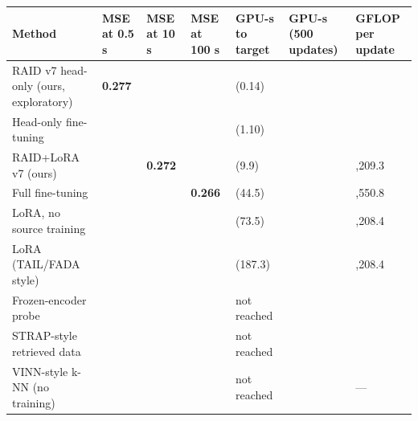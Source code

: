 \documentclass[11pt,a4paper]{article}
\begin{document}
{\def\LTcaptype{none} %
{\small
\begin{longtable}[]{@{}
  >{\raggedright\arraybackslash}p{}
  >{\raggedright\arraybackslash}p{}
  >{\raggedright\arraybackslash}p{}
  >{\raggedright\arraybackslash}p{}
  >{\raggedright\arraybackslash}p{}
  >{\raggedright\arraybackslash}p{}
  >{\raggedright\arraybackslash}p{}@{}}
\toprule\noalign{}
\begin{minipage}[b]{\linewidth}\raggedright
Method
\end{minipage} & \begin{minipage}[b]{\linewidth}\raggedright
MSE at 0.5 s
\end{minipage} & \begin{minipage}[b]{\linewidth}\raggedright
MSE at 10 s
\end{minipage} & \begin{minipage}[b]{\linewidth}\raggedright
MSE at 100 s
\end{minipage} & \begin{minipage}[b]{\linewidth}\raggedright
GPU-s to target
\end{minipage} & \begin{minipage}[b]{\linewidth}\raggedright
GPU-s (500 updates)
\end{minipage} & \begin{minipage}[b]{\linewidth}\raggedright
GFLOP per update
\end{minipage} \\
\midrule\noalign{}
\endhead
\bottomrule\noalign{}
\endlastfoot
RAID v7 head-only (ours, exploratory) & \textbf{0.277} & 0.287 & 0.287 & 0.1 (0.14) & 2.7 & 1.2 \\
Head-only fine-tuning & 0.292 & 0.280 & 0.280 & 1.0 (1.10) & 1.1 & 0.3 \\
RAID+LoRA v7 (ours) & 0.500 & \textbf{0.272} & 0.291 & 9.4 (9.9) & 201.3 & 5,209.3 \\
Full fine-tuning & 1.055 & 1.055 & \textbf{0.266} & 43.5 (44.5) & 444.2 & 13,550.8 \\
LoRA, no source training & 1.339 & 0.799 & 0.278 & 64.7 (73.5) & 183.8 & 5,208.4 \\
LoRA (TAIL/FADA style) & 1.055 & 0.315 & 0.287 & 187.3 (187.3) & 188.6 & 5,208.4 \\
Frozen-encoder probe & 0.286 & 0.295 & 0.295 & not reached & 1.1 & 0.3 \\
STRAP-style retrieved data & 0.325 & 0.326 & 0.326 & not reached & 1.7 & 0.3 \\
VINN-style k-NN (no training) & 0.376 & 0.376 & 0.376 & not reached & 0 & --- \\
\end{longtable}
}
}
\end{document}

